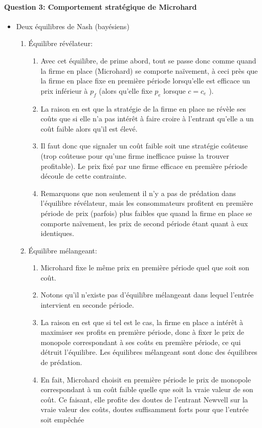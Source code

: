 \begin{frame}
  [allowframebreaks]{\insertsection}
  \framesubtitle{Question 3: Comportement stratégique de Microhard}
  \begin{itemize}
    \item Deux équilibres de Nash (bayésiens)
\begin{enumerate}
  \item Équilibre révélateur:
  \begin{enumerate}[$\cdot$]
    \item Avec cet équilibre, de prime abord, tout se passe donc comme 
    quand la firme en place (Microhard)  se comporte naïvement, 
    à ceci près que la firme en place fixe en première période lorsqu’elle est efficace un prix inférieur à $p_f$ (alors qu’elle fixe $p_e$ lorsque $c = c_e$ ).
    \item La raison en est que la stratégie de la firme en place ne révèle ses coûts que si elle n’a pas intérêt à faire croire à l’entrant qu’elle a un coût faible alors qu’il est élevé.
    \item Il faut donc que signaler un coût faible soit une stratégie coûteuse (trop coûteuse pour qu’une firme inefficace puisse la trouver profitable). Le prix fixé par une firme 
    efficace en première période découle de cette contrainte.
    \item Remarquons que non seulement il n’y a pas de prédation 
    dans l’équilibre révélateur, mais les consommateurs profitent en première période de prix (parfois) plus faibles que quand la firme en place se comporte naïvement, les prix de second période étant quant à eux identiques.
  \end{enumerate}

  \framebreak

  \item Équilibre mélangeant:
  \begin{enumerate}[$\cdot$]
    \item Microhard fixe le même prix en première période quel que soit son coût. 
\item Notons qu’il n’existe pas d’équilibre mélangeant dans lequel l’entrée intervient en seconde période.
\item La raison en est que si tel est le cas, la firme en place a intérêt à maximiser ses profits en première période, donc à fixer le prix de monopole correspondant à ses coûts en première période, ce qui détruit l’équilibre. Les équilibres mélangeant sont donc des équilibres de prédation.
\item En fait, Microhard choisit en première période le prix de monopole correspondant à un coût faible quelle que soit la vraie valeur de son coût. Ce faisant, elle profite des doutes de l’entrant Newvell sur la vraie valeur des coûts, doutes suffisamment forts pour que l’entrée soit empêchée
  \end{enumerate}
\end{enumerate}
  \end{itemize}
\end{frame}  



